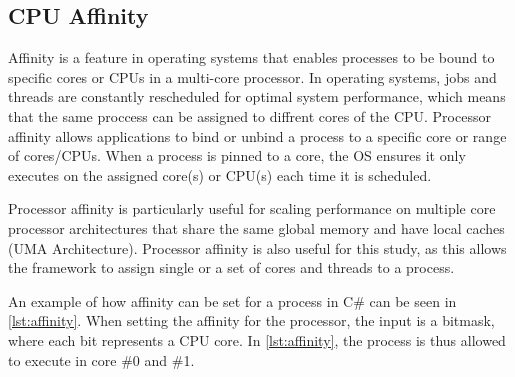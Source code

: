 \subsection{CPU Affinity}

Affinity is a feature in operating systems that enables processes to be bound to specific cores or CPUs in a multi-core processor. In operating systems, jobs and threads are constantly rescheduled for optimal system performance, which means that the same proccess can be assigned to diffrent cores of the CPU. Processor affinity allows applications to bind or unbind a process to a specific core or range of cores/CPUs. When a process is pinned to a core, the OS ensures it only executes on the assigned core(s) or CPU(s) each time it is scheduled.\cite{affinity}



Processor affinity is particularly useful for scaling performance on multiple core processor architectures that share the same global memory and have local caches (UMA Architecture). Processor affinity is also useful for this study, as this allows the framework to assign single or a set of cores and threads to a process.\cite{affinity}\newline

An example of how affinity can be set for a process in C\# can be seen in \cref{lst:affinity}. When setting the affinity for the processor, the input is a bitmask, where each bit represents a CPU core. In \cref{lst:affinity}, the process is thus allowed to execute in core \#0 and \#1.
